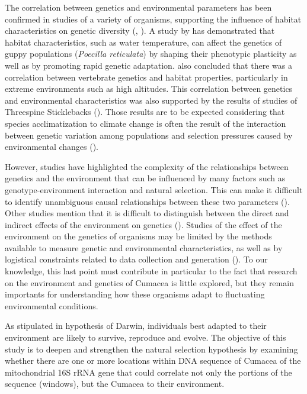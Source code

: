 The correlation between genetics and environmental parameters has been confirmed in studies of a variety of organisms, supporting the influence of habitat characteristics on genetic diversity (\cite{colosimo_widespread_2005}, \cite{cheviron_genomic_2012}). A study by \cite{ghalambor_adaptive_2007} has demonstrated that habitat characteristics, such as water temperature, can affect the genetics of guppy populations (\emph{Poecilla reticulata}) by shaping their phenotypic plasticity as well as by promoting rapid genetic adaptation. \cite{cheviron_genomic_2012} also concluded that there was a correlation between vertebrate genetics and habitat properties, particularly in extreme environments such as high altitudes. This correlation between genetics and environmental characteristics was also supported by the results of studies of Threespine Sticklebacks (\cite{colosimo_widespread_2005}). Those results are to be expected considering that species acclimatization to climate change is often the result of the interaction between genetic variation among populations and selection pressures caused by environmental changes (\cite{hoffmann_climate_2011}).

However, studies have highlighted the complexity of the relationships between genetics and the environment that can be influenced by many factors such as genotype-environment interaction and natural selection. This can make it difficult to identify unambiguous causal relationships between these two parameters (\cite{balkenhol_identifying_2009}). Other studies mention that it is difficult to distinguish between the direct and indirect effects of the environment on genetics (\cite{manel_perspectives_2010, balkenhol_landscape_2019}). Studies of the effect of the environment on the genetics of organisms may be limited by the methods available to measure genetic and environmental characteristics, as well as by logistical constraints related to data collection and generation (\cite{manel_perspectives_2010, shafer_widespread_2013}). To our knowledge, this last point must contribute in particular to the fact that research on the environment and genetics of Cumacea is little explored, but they remain importants for understanding how these organisms adapt to fluctuating environmental conditions. 

As stipulated in hypothesis of Darwin, individuals best adapted to their environment are likely to survive, reproduce and evolve. The objective of this study is to deepen and strengthen the natural selection hypothesis by examining whether there are one or more locations within DNA sequence of Cumacea of the mitochondrial 16S rRNA gene that could correlate not only the portions of the sequence (windows), but the Cumacea to their environment.


